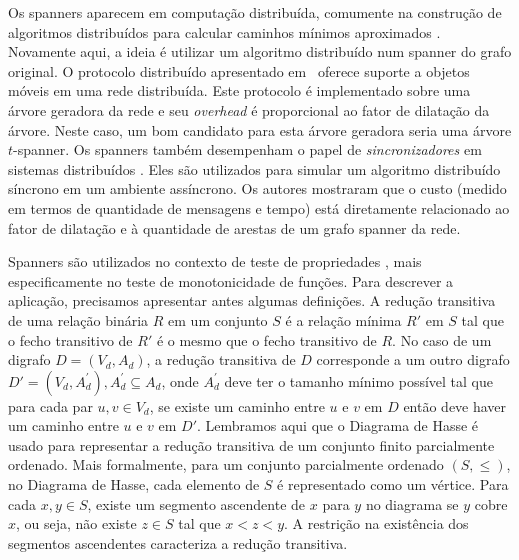 Os spanners aparecem em computação distribuída, comumente 
na construção de algoritmos distribuídos para calcular caminhos
mínimos aproximados \cite{Elkin2005, ElkinZ2006,BeckerKKL2017}.
Novamente aqui, a ideia é utilizar um algoritmo distribuído num 
spanner do grafo original. 
O protocolo distribuído apresentado em~\cite{DemmerH1998} oferece suporte a objetos móveis em uma rede distribuída. Este protocolo é implementado sobre uma árvore geradora da rede e seu \emph{overhead} é proporcional ao fator de dilatação da árvore. Neste caso, um bom candidato para esta árvore geradora seria uma árvore $t$-spanner.  Os spanners também desempenham o papel de \emph{sincronizadores} em sistemas distribuídos \cite{Awerbuch1985,PelegU1989}. Eles são utilizados para simular um algoritmo distribuído síncrono em um ambiente assíncrono.  Os autores mostraram que o custo (medido em termos de quantidade de mensagens e tempo) está diretamente relacionado ao fator de dilatação e à quantidade de arestas de um grafo spanner da rede.

Spanners são utilizados no contexto de teste de propriedades
\cite{BhattacharyyaGJRW2009, BhattacharyyaGJJRW2010,BermanBMRY2011}, mais
especificamente no teste de monotonicidade de funções. Para descrever
a aplicação, precisamos apresentar antes algumas definições.
A redução transitiva de uma relação binária $R$ em um conjunto $S$ é a relação mínima $R'$ em $S$ tal que o fecho transitivo de $R'$ é o mesmo que o fecho transitivo de $R$. No caso de um digrafo $D = (V_d, A_d)$, a redução transitiva de $D$ corresponde a um outro digrafo $D' = (V_d, A_d^{'}), A_d^{'} \subseteq A_d$, onde $A_d^{'}$ deve ter o tamanho mínimo possível tal que para cada par $u, v \in V_d$, se existe um caminho entre $u$ e $v$ em $D$ então deve haver um caminho entre $u$ e $v$ em $D'$. Lembramos aqui que o Diagrama de Hasse é usado para representar a redução transitiva de um conjunto finito parcialmente ordenado. Mais formalmente, para um conjunto parcialmente ordenado $(S, \le)$, no Diagrama de Hasse, cada elemento de $S$ é representado como um vértice. Para cada $x, y \in S$, existe um segmento ascendente de $x$ para $y$ no diagrama se $y$ cobre $x$, ou seja, não existe $z \in S$ tal que $x < z < y$. A restrição na existência dos segmentos ascendentes caracteriza a redução transitiva.


